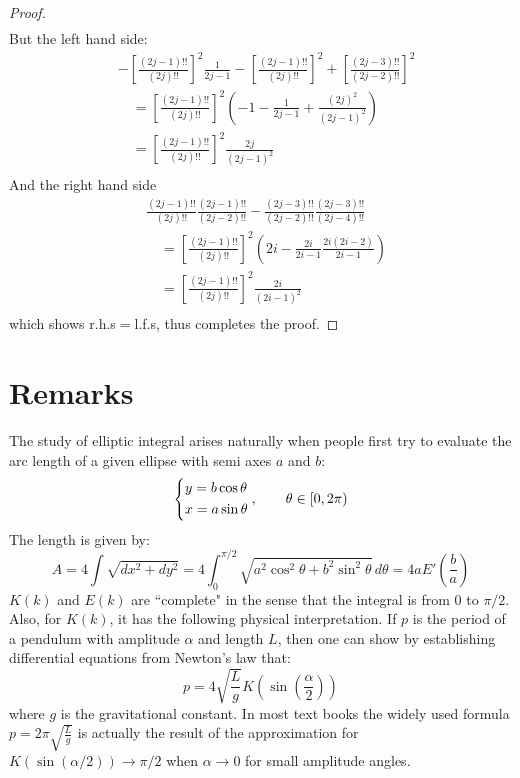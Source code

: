 \documentclass{report}
\begin{document}
\begin{titlepage}
\begin{proof}
\begin{align*}
\end{align*}
But the left hand side:
\begin{align*}
&-\left[\frac{(2j-1)!!}{(2j)!!}\right]^2\frac{1}{2j-1}
-\left[\frac{(2j-1)!!}{(2j)!!}\right]^2+\left[\frac{(2j-3)!!}{(2j-2)!!}\right]^2\\
&\quad=\left[\frac{(2j-1)!!}{(2j)!!}\right]^2\left(-1-\frac{1}{2j-1}+\frac{(2j)^2}{(2j-1)^2}\right)\\
&\quad=\left[\frac{(2j-1)!!}{(2j)!!}\right]^2\frac{2j}{(2j-1)^2}\\
\end{align*}
And the right hand side
\begin{align*}
&\frac{(2j-1)!!}{(2j)!!}\frac{(2j-1)!!}{(2j-2)!!}-\frac{(2j-3)!!}{(2j-2)!!}\frac{(2j-3)!!}{(2j-4)!!}\\
&\quad=\left[\frac{(2j-1)!!}{(2j)!!}\right]^2\left(2i-\frac{2i}{2i-1}\frac{2i(2i-2)}{2i-1}\right)\\
&\quad=\left[\frac{(2j-1)!!}{(2j)!!}\right]^2 \frac{2i}{(2i-1)^2}\\
\end{align*}
which shows r.h.s$=$l.f.s, thus completes the proof.
\end{proof}
\section{Remarks\hfill}
The study of elliptic integral arises naturally when people first try to evaluate the arc length of a given ellipse with semi axes $a$ and $b$\cite{Borwein:1987aa}:\\
\[
\begin{dcases}
y=b\cos\theta\\
x=a\sin\theta
	\end{dcases},\qquad\theta\in[0,2\pi)
\]
The length is given by\cite{Borwein:1987aa}:
\[
A=4\int\sqrt{dx^2+dy^2}=4\int_0^{\pi/2}\sqrt{a^2\cos^2\theta+b^2\sin^2\theta}\,d\theta=4aE'\left(\frac{b}{a}\right)
\]
$K(k)$ and $E(k)$ are ``complete" in the sense that the integral is from $0$ to $\pi/2$. Also, for $K(k)$, it has the following physical interpretation\cite{Borwein:1987aa}. If $p$ is the period of a pendulum with amplitude $\alpha$ and length $L$, then one can show by establishing differential equations from Newton's law that:
\[
p=4\sqrt{\frac{L}{g}}K\left(\sin\left(\frac{\alpha}{2}\right)\right)
\]
where $g$ is the gravitational constant. In most text books the widely used formula $p=2\pi\sqrt{\frac{L}{g}}$ is actually the result of the approximation for $K(\sin(\alpha/2))\to\pi/2$ when $\alpha\to0$ for small amplitude angles.


\end{titlepage}
\end{document}
